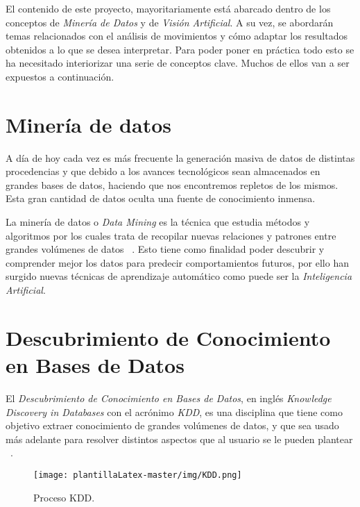 
El contenido de este proyecto, mayoritariamente está abarcado dentro de los conceptos de \textit{Minería de Datos} y de \textit{Visión Artificial}. A su vez, se abordarán temas relacionados con el análisis de movimientos y cómo adaptar los resultados obtenidos a lo que se desea interpretar. Para poder poner en práctica todo esto se ha necesitado interiorizar una serie de conceptos clave. Muchos de ellos van a ser expuestos a continuación.

\section{Minería de datos}
A día de hoy cada vez es más frecuente la generación masiva de datos de distintas procedencias y que debido a los avances tecnológicos sean almacenados en grandes bases de datos, haciendo que nos encontremos repletos de los mismos. Esta gran cantidad de datos oculta una fuente de conocimiento inmensa. 

La minería de datos o \textit{Data Mining} es la técnica que estudia métodos y algoritmos por los cuales trata de recopilar nuevas relaciones y patrones entre grandes volúmenes de datos ~\cite{perez2007mineria}. Esto tiene como finalidad poder descubrir y comprender mejor los datos para predecir comportamientos futuros, por ello han surgido nuevas técnicas de aprendizaje automático como puede ser la \textit{Inteligencia Artificial}.


\section{Descubrimiento de Conocimiento en Bases de Datos}

El \emph{Descubrimiento de Conocimiento en Bases de Datos}, en inglés \textit{Knowledge Discovery in Databases} con el acrónimo \emph{KDD}, es una disciplina que tiene como objetivo extraer conocimiento de grandes volúmenes de datos, y que sea usado más adelante para resolver distintos aspectos que al usuario se le pueden plantear ~\cite{fayyad1996kdd}. 

\begin{figure}[H]
    \centering
    \texttt{[image: plantillaLatex-master/img/KDD.png]}
    \caption{Proceso KDD.}
    \label{fig:kdd}
\end{figure}

